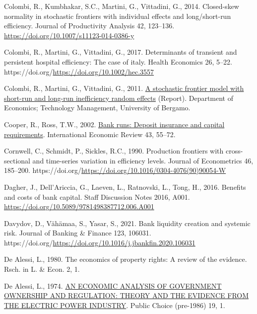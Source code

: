 \documentclass[
  12pt,
  a4paper,
]{scrreprt}
\newlength{\cslhangindent}
\newenvironment{CSLReferences}[2] %
 {\begin{list}{}{%
  \setlength{\itemindent}{0pt}
  \setlength{\leftmargin}{0pt}
  \setlength{\parsep}{0pt}
  \ifodd #1
   \setlength{\leftmargin}{\cslhangindent}
   \setlength{\itemindent}{-1\cslhangindent}
  \fi
  \setlength{\itemsep}{#2\baselineskip}}}
 {\end{list}}
\begin{document}
\begin{CSLReferences}{1}{0}
Colombi, R., Kumbhakar, S.C., Martini, G., Vittadini, G., 2014.
Closed-skew normality in stochastic frontiers with individual effects
and long/short-run efficiency. Journal of Productivity Analysis 42,
123--136. \url{https://doi.org/10.1007/s11123-014-0386-y}

Colombi, R., Martini, G., Vittadini, G., 2017. Determinants of transient
and persistent hospital efficiency: The case of italy. Health Economics
26, 5--22. https://doi.org/\url{https://doi.org/10.1002/hec.3557}

Colombi, R., Martini, G., Vittadini, G., 2011.
\href{https://EconPapers.repec.org/RePEc:brh:wpaper:1101}{A stochastic
frontier model with short-run and long-run inefficiency random effects}
(Report). Department of Economics; Technology Management, University of
Bergamo.

Cooper, R., Ross, T.W., 2002.
\href{http://www.jstor.org.queens.ezp1.qub.ac.uk/stable/827056}{Bank
runs: Deposit insurance and capital requirements}. International
Economic Review 43, 55--72.

Cornwell, C., Schmidt, P., Sickles, R.C., 1990. Production frontiers
with cross-sectional and time-series variation in efficiency levels.
Journal of Econometrics 46, 185--200.
https://doi.org/\url{https://doi.org/10.1016/0304-4076(90)90054-W}

Dagher, J., Dell'Ariccia, G., Laeven, L., Ratnovski, L., Tong, H., 2016.
Benefits and costs of bank capital. Staff Discussion Notes 2016, A001.
\url{https://doi.org/10.5089/9781498387712.006.A001}

Davydov, D., Vähämaa, S., Yasar, S., 2021. Bank liquidity creation and
systemic risk. Journal of Banking \& Finance 123, 106031.
https://doi.org/\url{https://doi.org/10.1016/j.jbankfin.2020.106031}

De Alessi, L., 1980. The economics of property rights: A review of the
evidence. Rsch. in L. \& Econ. 2, 1.

De Alessi, L., 1974.
\href{https://queens.ezp1.qub.ac.uk/login?url=https://www.proquest.com/scholarly-journals/economic-analysis-government-ownership-regulation/docview/236987376/se-2?accountid=13374\%0Ahttps://resolver.ebscohost.com/openurl?ctx_ver=Z39.88-2004&ctx_enc=info:ofi/enc:UTF-8&rfr_id=info:sid/ProQ\%3Aabiglobal&rft_val_fmt=info:ofi/fmt:kev:mtx:journal&rft.genre=unknown&rft.jtitle=Public+Choice+\%28pre-1986\%29&rft.atitle=AN+ECONOMIC+ANALYSIS+OF+GOVERNMENT+OWNERSHIP+AND+REGULATION\%3A+THEORY+AND+THE+EVIDENCE+FROM+THE+ELECTRIC+POWER+INDUSTRY&rft.au=De+Alessi\%2C+Louis&rft.aulast=De+Alessi&rft.aufirst=Louis&rft.date=1974-10-01&rft.volume=19&rft.issue=&rft.spage=1&rft.isbn=&rft.btitle=&rft.title=Public+Choice+\%28pre-1986\%29&rft.issn=00485829&rft_id=info:doi/}{AN
ECONOMIC ANALYSIS OF GOVERNMENT OWNERSHIP AND REGULATION: THEORY AND THE
EVIDENCE FROM THE ELECTRIC POWER INDUSTRY}. Public Choice (pre-1986) 19,
1.


\end{CSLReferences}
\end{document}

